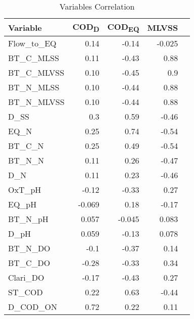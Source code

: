 \begin{longtable}[h!]{@{}l *{2}{rr}}
\caption[Portrait Table, short caption]{Variables Correlation}
\label{t:correlation_table}
\\
%   
\toprule%


 {\bfseries Variable} & {\bfseries COD\textsubscript{D} } & {\bfseries COD\textsubscript{EQ}} & {\bfseries MLVSS}
\\

\cmidrule[0.4pt](r{0.125em}){1-1}%
\cmidrule[0.4pt](lr{0.125em}){2-4}%


  \endfirsthead

\endhead

        Flow\_to\_EQ & 0.14 & -0.14 & -0.025  \\ 
        BT\_C\_MLSS & 0.11 & -0.43 & 0.88  \\ 
        BT\_C\_MLVSS & 0.10 & -0.45 & 0.9  \\ 
        BT\_N\_MLSS & 0.10 & -0.44 & 0.88  \\ 
        BT\_N\_MLVSS & 0.10 & -0.44 & 0.88  \\ 
        D\_SS & 0.3 & 0.59 & -0.46  \\ 
        EQ\_N & 0.25 & 0.74 & -0.54  \\ 
        BT\_C\_N & 0.25 & 0.49 & -0.54  \\ 
        BT\_N\_N & 0.11 & 0.26 & -0.47  \\ 
        D\_N & 0.11 & 0.23 & -0.46  \\ 
        OxT\_pH & -0.12 & -0.33 & 0.27  \\ 
        EQ\_pH & -0.069 & 0.18 & -0.17  \\ 
        BT\_N\_pH & 0.057 & -0.045 & 0.083  \\ 
        D\_pH & 0.059 & -0.13 & 0.078  \\ 
        BT\_N\_DO & -0.1 & -0.37 & 0.14  \\ 
        BT\_C\_DO & -0.28 & -0.33 & 0.34  \\ 
        Clari\_DO & -0.17 & -0.43 & 0.27  \\ 
        ST\_COD & 0.22 & 0.63 & -0.44  \\ 
        D\_COD\_ON & 0.72 & 0.22 & 0.11  \\


\bottomrule

\end{longtable}